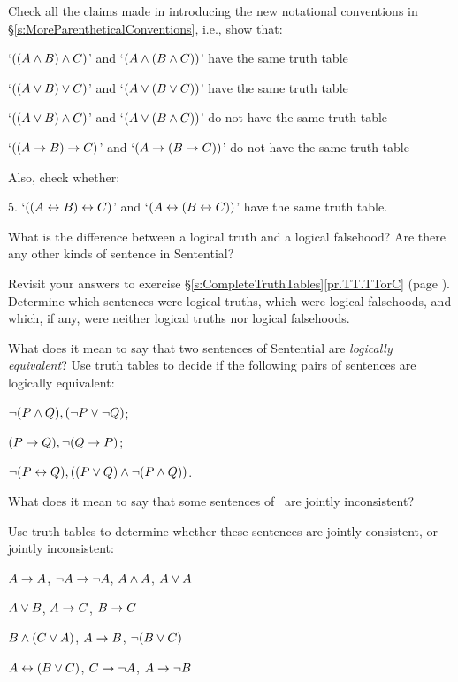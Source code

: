 \practiceproblems
\problempart
Check all the claims made in introducing the new notational conventions in §\ref{s:MoreParentheticalConventions}, i.e., show that:
\begin{earg}
	\item `$((A \wedge B) \wedge C)$' and `$(A \wedge (B \wedge C))$' have the same truth table
	\item `$((A \vee B) \vee C)$' and `$(A \vee (B \vee C))$' have the same truth table
	\item `$((A \vee B) \wedge C)$' and `$(A \vee (B \wedge C))$' do not have the same truth table
	\item `$((A \rightarrow B) \rightarrow C)$' and `$(A \rightarrow (B \rightarrow C))$' do not have the same truth table
\end{earg}
Also, check whether:
\begin{earg}
	\item[5.] `$((A \leftrightarrow B) \leftrightarrow C)$' and `$(A \leftrightarrow (B \leftrightarrow C))$' have the same truth table.
\end{earg}
\problempart
What is the difference between a logical truth and a logical falsehood? Are there any other kinds of sentence in Sentential?

Revisit your answers to exercise §\ref{s:CompleteTruthTables}\ref{pr.TT.TTorC} (page \pageref{pr.TT.TTorC.p}). Determine which sentences were logical truths, which were logical falsehoods, and which, if any, were neither logical truths nor logical falsehoods.

\problempart
What does  it  mean  to  say  that  two sentences  of  Sentential  are \emph{logically equivalent}? Use  truth  tables  to  decide  if  the  following  pairs  of sentences are logically equivalent:
\begin{earg}
	\item $\neg(P \wedge Q), (\neg P \vee \neg Q)$;
	\item $(P \rightarrow Q), \neg(Q \rightarrow P)$;
	\item $\neg (P \leftrightarrow Q), ((P \vee Q) \wedge \neg (P \wedge Q))$.
\end{earg}

\problempart
\label{pr.TT.consistent} What does it mean to say that some sentences of \TFL\ are jointly inconsistent?

Use truth tables to determine whether these sentences are jointly consistent, or jointly inconsistent:
\begin{earg}
\item $A\rightarrow A$, $\neg A \rightarrow \neg A$, $A\wedge A$, $A\vee A$ %
\item $A\vee B$, $A\rightarrow C$, $B\rightarrow C$ %
\item $B\wedge(C\vee A)$, $A\rightarrow B$, $\neg(B\vee C)$  %
\item $A\leftrightarrow(B\vee C)$, $C\rightarrow \neg A$, $A\rightarrow \neg B$ %
\end{earg}


